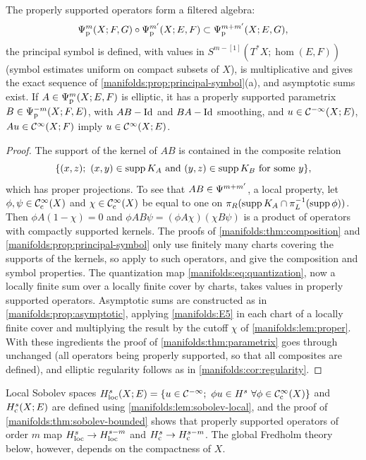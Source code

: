\begin{proposition}\label{manifolds:prop:proper-calculus}
The properly supported operators form a filtered algebra:
\begin{equation*}
\Psi^{m}_{\mathrm p}(X;F,G)\circ\Psi^{m'}_{\mathrm p}(X;E,F)\subset\Psi^{m+m'}_{\mathrm p}(X;E,G),
\end{equation*}
the principal symbol is defined, with values in $S^{m-[1]}(T^*X;\hom(E,F))$ (symbol
estimates uniform on compact subsets of $X$), is multiplicative and gives the
exact sequence of \cref{manifolds:prop:principal-symbol}(a), and asymptotic sums
exist. If $A\in\Psi^{m}_{\mathrm p}(X;E,F)$ is elliptic, it has a properly supported
parametrix $B\in\Psi^{-m}_{\mathrm p}(X;F,E)$, with $AB-\operatorname{Id}$ and $BA-\operatorname{Id}$ smoothing,
and $u\in\mathcal{C}^{-\infty}(X;E)$, $Au\in\mathcal{C}^\infty(X;F)$ imply $u\in\mathcal{C}^\infty(X;E)$.
\end{proposition}
\begin{proof}
The support of the kernel of $AB$ is contained in the composite relation
\begin{equation*}
\{(x,z);\ (x,y)\in\operatorname{supp} K_A\text{ and }(y,z)\in\operatorname{supp} K_B\text{ for some }y\},
\end{equation*}
which has proper projections. To see that $AB\in\Psi^{m+m'}$, a local property, let
$\phi,\psi\in\mathcal{C}^\infty_{\mathrm{c}}(X)$ and $\chi\in\mathcal{C}^\infty_{\mathrm{c}}(X)$ be equal to one on
$\pi_R(\operatorname{supp} K_A\cap\pi_L^{-1}(\operatorname{supp}\phi))$. Then $\phi A(1-\chi)=0$ and
$\phi AB\psi=(\phi A\chi)(\chi B\psi)$ is a product of operators with compactly
supported kernels. The proofs of \cref{manifolds:thm:composition} and
\cref{manifolds:prop:principal-symbol} only use finitely many charts covering the
supports of the kernels, so apply to such operators, and give the composition and
symbol properties. The quantization map \eqref{manifolds:eq:quantization}, now a
locally finite sum over a locally finite cover by charts, takes values in properly
supported operators. Asymptotic sums are constructed as in
\cref{manifolds:prop:asymptotic}, applying \ref{manifolds:E5} in each chart of a
locally finite cover and multiplying the result by the cutoff $\chi$ of
\cref{manifolds:lem:proper}. With these ingredients the proof of
\cref{manifolds:thm:parametrix} goes through unchanged (all operators being
properly supported, so that all composites are defined), and elliptic regularity
follows as in \cref{manifolds:cor:regularity}.
\end{proof}

Local Sobolev spaces $\Hs s_{\mathrm{loc}}(X;E)=\{u\in\CmI;\ \phi u\in\Hs s\ \forall\phi\in\CIc(X)\}$
and $H^{s}_{\mathrm c}(X;E)$ are defined using \cref{manifolds:lem:sobolev-local}, and
the proof of \cref{manifolds:thm:sobolev-bounded} shows that properly supported
operators of order $m$ map $H^{s}_{\mathrm{loc}}\to H^{s-m}_{\mathrm{loc}}$ and
$H^{s}_{\mathrm c}\to H^{s-m}_{\mathrm c}$. The global Fredholm theory below, however,
depends on the compactness of $X$.

